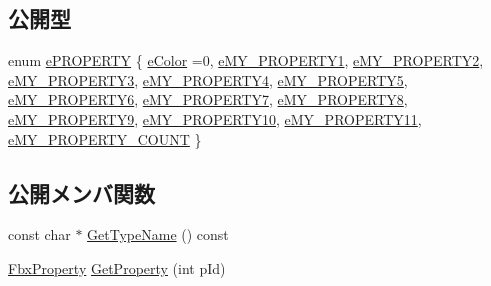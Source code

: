 \subsection*{公開型}
\begin{DoxyCompactItemize}
\item 
enum \hyperlink{class_my_k_fbx_mesh_a8344a454859b89ec1d69eed93edfe76e}{e\+P\+R\+O\+P\+E\+R\+TY} \{ \newline
\hyperlink{class_my_k_fbx_mesh_a8344a454859b89ec1d69eed93edfe76eaafb1b988cde41c39316fcc1ae211ef69}{e\+Color} =0, 
\hyperlink{class_my_k_fbx_mesh_a8344a454859b89ec1d69eed93edfe76ea5f1b50cbd2f77ad277d2e9b0acfc1c2b}{e\+M\+Y\+\_\+\+P\+R\+O\+P\+E\+R\+T\+Y1}, 
\hyperlink{class_my_k_fbx_mesh_a8344a454859b89ec1d69eed93edfe76ea212a2eaa2a8d242ad7a73c3210707dcd}{e\+M\+Y\+\_\+\+P\+R\+O\+P\+E\+R\+T\+Y2}, 
\hyperlink{class_my_k_fbx_mesh_a8344a454859b89ec1d69eed93edfe76ea64d7761f0645fee69d89002ef198340a}{e\+M\+Y\+\_\+\+P\+R\+O\+P\+E\+R\+T\+Y3}, 
\newline
\hyperlink{class_my_k_fbx_mesh_a8344a454859b89ec1d69eed93edfe76eab5c9da979ce124ce796f5260112d6977}{e\+M\+Y\+\_\+\+P\+R\+O\+P\+E\+R\+T\+Y4}, 
\hyperlink{class_my_k_fbx_mesh_a8344a454859b89ec1d69eed93edfe76ea3c9af0bfa7a731139f724fa505aa71b6}{e\+M\+Y\+\_\+\+P\+R\+O\+P\+E\+R\+T\+Y5}, 
\hyperlink{class_my_k_fbx_mesh_a8344a454859b89ec1d69eed93edfe76ea0570ca1f7266321378e6bd0f3fec3129}{e\+M\+Y\+\_\+\+P\+R\+O\+P\+E\+R\+T\+Y6}, 
\hyperlink{class_my_k_fbx_mesh_a8344a454859b89ec1d69eed93edfe76eaa8098cb0e77ef77b91a8a35f112f7c7b}{e\+M\+Y\+\_\+\+P\+R\+O\+P\+E\+R\+T\+Y7}, 
\newline
\hyperlink{class_my_k_fbx_mesh_a8344a454859b89ec1d69eed93edfe76ead701454912cf834909797f7c8d2a0a4d}{e\+M\+Y\+\_\+\+P\+R\+O\+P\+E\+R\+T\+Y8}, 
\hyperlink{class_my_k_fbx_mesh_a8344a454859b89ec1d69eed93edfe76ea32891212d284b16b7a93a70be10fd54d}{e\+M\+Y\+\_\+\+P\+R\+O\+P\+E\+R\+T\+Y9}, 
\hyperlink{class_my_k_fbx_mesh_a8344a454859b89ec1d69eed93edfe76eabf521a1580ff6a6e690531c03ced4fbf}{e\+M\+Y\+\_\+\+P\+R\+O\+P\+E\+R\+T\+Y10}, 
\hyperlink{class_my_k_fbx_mesh_a8344a454859b89ec1d69eed93edfe76ea8b479e1afc682cfbf26518fd73df90f1}{e\+M\+Y\+\_\+\+P\+R\+O\+P\+E\+R\+T\+Y11}, 
\newline
\hyperlink{class_my_k_fbx_mesh_a8344a454859b89ec1d69eed93edfe76ea46b64d1375a91a8cb797e5e8fac124e7}{e\+M\+Y\+\_\+\+P\+R\+O\+P\+E\+R\+T\+Y\+\_\+\+C\+O\+U\+NT}
 \}
\end{DoxyCompactItemize}
\subsection*{公開メンバ関数}
\begin{DoxyCompactItemize}
\item 
const char $\ast$ \hyperlink{class_my_k_fbx_mesh_a12507f999188a123a733b372ae5c0cf5}{Get\+Type\+Name} () const
\item 
\hyperlink{class_fbx_property}{Fbx\+Property} \hyperlink{class_my_k_fbx_mesh_a3f0c644f91e9d8def6c896028fa29757}{Get\+Property} (int p\+Id)
\end{DoxyCompactItemize}
